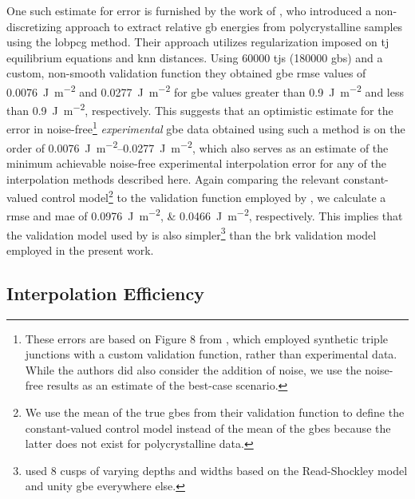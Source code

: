\documentclass[final,twocolumn,12pt]{elsarticle}
\begin{document}
One such estimate for error is furnished by the work of \citet{shenDeterminingGrainBoundary2019}, who introduced a non-discretizing approach to extract relative \gls{gb} energies from polycrystalline samples using the \gls{lobpcg} method. Their approach utilizes regularization imposed on \gls{tj} equilibrium equations and \gls{knn} distances. Using \num{60000} \glspl{tj} (\num{180000} \glspl{gb}) and a custom, non-smooth validation function they obtained \gls{gbe} \gls{rmse} values of \SI{0.0076}{\J\per\square\meter} and \SI{0.0277}{\J\per\square\meter} for \gls{gbe} values greater than \SI{0.9}{\J\per\square\meter} and less than \SI{0.9}{\J\per\square\meter}, respectively. This suggests that an optimistic estimate for the error in noise-free\footnote{These errors are based on Figure 8 from \citet{shenDeterminingGrainBoundary2019}, which employed synthetic triple junctions with a custom validation function, rather than experimental data. While the authors did also consider the addition of noise, we use the noise-free results as an estimate of the best-case scenario.} \emph{experimental} \gls{gbe} data obtained using such a method is on the order of \SIrange{0.0076}{0.0277}{\J\per\square\meter}, which also serves as an estimate of the minimum achievable noise-free experimental interpolation error for any of the interpolation methods described here. %
%
Again comparing the relevant constant-valued control model\footnote{We use the mean of the true \glspl{gbe} from their validation function to define the constant-valued control model instead of the mean of the \inpt{} \glspl{gbe} because the latter does not exist for polycrystalline data.} to the validation function employed by \citet{shenDeterminingGrainBoundary2019}, we calculate a \gls{rmse} and \gls{mae} of \SIlist{0.0976;0.0466}{\joule\per\square\meter}, respectively. This implies that the validation model used by \citet{shenDeterminingGrainBoundary2019} is also simpler\footnote{\citet{shenDeterminingGrainBoundary2019} used 8 cusps of varying depths and widths based on the Read-Shockley model and unity \gls{gbe} everywhere else.} than the \gls{brk} validation model employed in the present work.

\subsection{Interpolation Efficiency}
\label{sec:results:efficiency}
\end{document}
